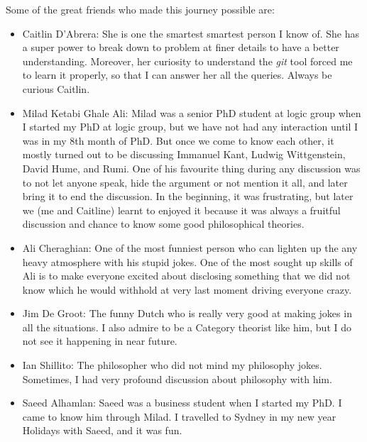   
Some of the great friends who made this journey possible are:
\begin{itemize}
\item Caitlin D'Abrera: 
  She is one the smartest smartest person I know of. She has a super power to break down to problem at finer details 
  to have a better understanding. Moreover, her curiosity to understand  the \textit{git} tool  forced me to learn it properly, 
  so that I can answer her all the queries. Always be curious Caitlin. 
  
 \item Milad Ketabi Ghale Ali: 
 Milad was a senior PhD student at logic group when I started my PhD at logic group, 
 but we have not had any interaction until I was in my 8th month of PhD. But once 
 we come to know each other, it mostly turned out to be discussing 
 Immanuel Kant, Ludwig Wittgenstein, David Hume, and Rumi. 
 One of his favourite thing during any discussion was to
 not let anyone speak, hide the argument or not mention it all, and later bring it 
 to end the discussion. In the beginning, it was frustrating, but later we (me and 
 Caitline) learnt to enjoyed it because it was always a fruitful discussion
 and chance to know some good philosophical theories.  
 
 \item  Ali Cheraghian:
  One of the most funniest person who can lighten up the any heavy atmosphere 
  with his stupid jokes.  One of the most sought up skills of Ali is to 
  make everyone excited about disclosing something that we did not know 
  which he would 
  withhold at very last moment driving everyone crazy. 
 
  \item   Jim De Groot:
  The funny Dutch who is really very good at making jokes in all the situations. I also 
  admire to be a Category theorist like him, but I do not see it happening in near 
  future. 
  
  \item  Ian Shillito:
  The philosopher who did not mind my philosophy jokes.  Sometimes, I had very 
  profound discussion about philosophy with him. 
  
  
  
  \item Saeed Alhamlan: 
  Saeed was a business student when I started my PhD. I came to know him through 
  Milad. I travelled to Sydney in my new year Holidays with Saeed, and it was 
  fun. 
  
\end{itemize} 


